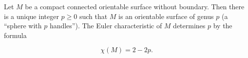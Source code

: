 Let $M$ be a compact connected orientable surface without boundary. Then there is a unique integer $p \geqslant 0$ such that $M$ is an orientable surface of genus $p$ (a ``sphere with $p$ handles''). The Euler characteristic of $M$ determines $p$ by the formula

$$\chi(M) = 2 - 2p.$$
